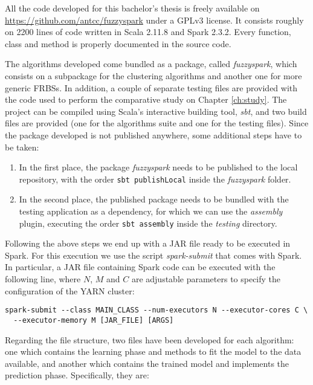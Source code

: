 %
%
%

All the code developed for this bachelor's thesis is freely available on \url{https://github.com/antcc/fuzzyspark} under a GPLv3 license. It consists roughly on 2200 lines of code written in Scala 2.11.8 and Spark 2.3.2. Every function, class and method is properly documented in the source code.

The algorithms developed come bundled as a package, called \textit{fuzzyspark}, which consists on a subpackage for the clustering algorithms and another one for more generic FRBSs. In addition, a couple of separate testing files are provided with the code used to perform the comparative study on Chapter \ref{ch:study}. The project can be compiled using Scala's interactive building tool, \textit{sbt}, and two build files are provided (one for the algorithms suite and one for the testing files). Since the package developed is not published anywhere, some additional steps have to be taken:

\begin{enumerate}[1.]
  \item In the first place, the package \textit{fuzzyspark} needs to be published to the local repository, with the order \verb|sbt publishLocal| inside the \textit{fuzzyspark} folder.
  \item In the second place, the published package needs to be bundled with the testing application as a dependency, for which we can use the \textit{assembly} plugin, executing the order \verb|sbt assembly| inside the \textit{testing} directory.
\end{enumerate}
Following the above steps we end up with a JAR file ready to be executed in Spark. For this execution we use the script \textit{spark-submit} that comes with Spark. In particular, a JAR file containing Spark code can be executed with the following line, where $N$, $M$ and $C$ are adjustable parameters to specify the configuration of the YARN cluster:

\begin{verbatim}
spark-submit --class MAIN_CLASS --num-executors N --executor-cores C \
  --executor-memory M [JAR_FILE] [ARGS]
\end{verbatim}

Regarding the file structure, two files have been developed for each algorithm: one which contains the learning phase and methods to fit the model to the data available, and another which contains the trained model and implements the prediction phase. Specifically, they are:

